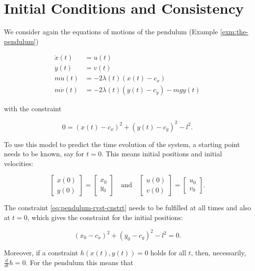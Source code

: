 \documentclass[]{book}
\theoremstyle{definition}
\theoremstyle{definition}
\theoremstyle{definition}
\theoremstyle{definition}
\theoremstyle{remark}
\begin{document}
\hypertarget{initial-conditions-and-consistency}{%
\section{Initial Conditions and Consistency}\label{initial-conditions-and-consistency}}

We consider again the equations of motions of the pendulum (Example \ref{exm:the-pendulum})

\begin{align*}
    \dot x(t) &= u(t) \\
    \dot y(t) &= v(t) \\
    m \dot u(t) &= - 2 \lambda(t) (x(t) - c_x) \\ 
    m \dot v(t) &= - 2 \lambda(t) (y(t) - c_y) - mgy(t)
\end{align*}

with the constraint

\begin{equation}
    0=(x(t) - c_x)^2 + (y(t) - c_y)^2 - l^2. \label{eq:pendulum-rvst-cnstrt}
\end{equation}

To use this model to predict the time evolution of the system, a starting point needs to be known, say for \(t=0\). This means initial positions and initial velocities:

\[
\begin{bmatrix} 
x(0) \\ y(0)
\end{bmatrix}
=
\begin{bmatrix} 
    x_0 \\ y_0
\end{bmatrix}
\quad\text{and}\quad
\begin{bmatrix} 
u(0) \\ v(0)
\end{bmatrix}
=
\begin{bmatrix} 
    u_0 \\ v_0
\end{bmatrix}.
\]

The constraint \eqref{eq:pendulum-rvst-cnstrt} needs to be fulfilled at all times and also at \(t=0\), which gives the constraint for the initial positions:

\begin{equation*}
    (x_0 - c_x)^2 + (y_0 - c_y)^2 - l^2=0.
\end{equation*}

Moreover, if a constraint \(h(x(t), y(t))=0\) holds for all \(t\), then, necessarily, \(\frac{d}{dt}h=0\). For the pendulum this means that
\end{document}
